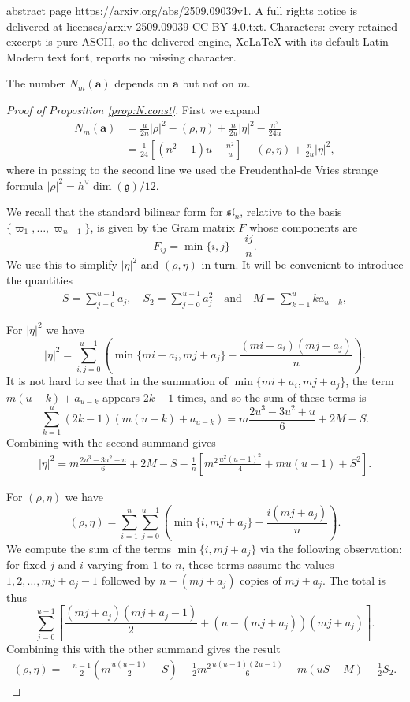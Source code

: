 \documentclass[10pt,a4paper]{amsart}
\newcommand{\g}{\mathfrak{g}}
\newcommand{\sll}{\mathfrak{sl}}
\begin{document}
abstract page https://arxiv.org/abs/2509.09039v1. A full rights notice is delivered at licenses/arxiv-2509.09039-CC-BY-4.0.txt. Characters: every retained excerpt is pure ASCII, so the delivered engine, XeLaTeX with its default Latin Modern text font, reports no missing character.
\begin{prop}\label{prop:N.const}
The number $N_m(\mathbf{a})$ depends on $\mathbf{a}$ but not on $m$.
\end{prop}

\begin{proof}[Proof of Proposition \ref{prop:N.const}]
First we expand
\begin{align*}
N_m(\mathbf{a}) &= \frac{u}{2n} |\rho|^2 - (\rho, \eta) + \frac{n}{2u}|\eta|^2 - \frac{n^2}{24u} \\
%
&= \frac{1}{24}\left[(n^2-1)u - \frac{n^2}{u}\right] - (\rho, \eta) + \frac{n}{2u}|\eta|^2,
\end{align*}
where in passing to the second line we used the Freudenthal-de Vries strange formula $|\rho|^2 = h^\vee \dim(\g) / 12$.

We recall that the standard bilinear form for $\sll_n$, relative to the basis $\{\varpi_1, \ldots, \varpi_{n-1}\}$, is given by the Gram matrix $F$ whose components are
\[
F_{ij} = \min\{i, j\} - \frac{ij}{n}.
\]
We use this to simplify $|\eta|^2$ and $(\rho, \eta)$ in turn. It will be convenient to introduce the quantities
\begin{align*}
S = \sum_{j=0}^{u-1} a_j, \quad S_2 = \sum_{j=0}^{u-1} a_j^2 \quad \text{and} \quad M = \sum_{k=1}^{u} k a_{u-k},
\end{align*}

For $|\eta|^2$ we have
\[
|\eta|^2 = \sum_{i, j=0}^{u-1} \left( \min\{mi+a_i, mj+a_j\} - \frac{(mi+a_i)(mj+a_j)}{n} \right).
\]
It is not hard to see that in the summation of $\min\{mi+a_i, mj+a_j\}$, the term $m(u-k)+a_{u-k}$ appears $2k-1$ times, and so the sum of these terms is
\[
\sum_{k=1}^u (2k-1) (m(u-k) + a_{u-k}) = m \frac{2u^3-3u^2+u}{6} + 2M - S.
\]
Combining with the second summand gives
\begin{align*}
|\eta|^2 = m \frac{2u^3-3u^2+u}{6} + 2M - S - \frac{1}{n}\left[m^2\frac{u^2(u-1)^2}{4} + mu(u-1) + S^2\right].
\end{align*}

For $(\rho, \eta)$ we have
\[
(\rho, \eta) = \sum_{i=1}^n \sum_{j=0}^{u-1} \left( \min\{i, mj+a_j\} - \frac{i(mj+a_j)}{n} \right).
\]
We compute the sum of the terms $\min\{i, mj+a_j\}$ via the following observation: for fixed $j$ and $i$ varying from $1$ to $n$, these terms assume the values $1, 2, \ldots, mj+a_j-1$ followed by $n-(mj+a_j)$ copies of $mj+a_j$. The total is thus
\[
\sum_{j=0}^{u-1} \left[ \frac{(mj+a_j)(mj+a_j-1)}{2} + (n - (mj + a_j))(mj+a_j) \right].
\]
Combining this with the other summand gives the result
\begin{align*}
(\rho, \eta) = -\frac{n-1}{2}\left(m \frac{u(u-1)}{2} + S\right) - \frac{1}{2}m^2 \frac{u(u-1)(2u-1)}{6} - m(uS-M) - \frac{1}{2}S_2.
\end{align*}


\end{proof}
\end{document}
